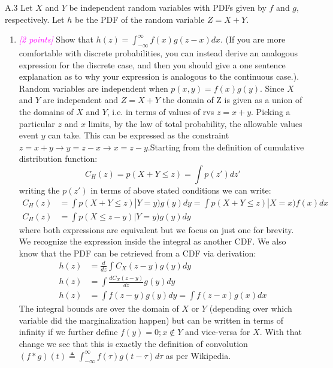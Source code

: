 \documentclass{article}
\newcommand{\1}{\mathbf{1}}
\newcommand{\points}[1]{\small\textcolor{magenta}{\emph{[#1 points]}} \normalsize}
\begin{document}
\newpage
A.3 Let $X$ and $Y$ be independent random variables with PDFs given by $f$ and $g$, respectively. Let $h$ be the PDF of the random variable $Z = X+Y$.
\begin{enumerate}
	\item \points{2} Show that $h(z) = \int_{-\infty}^\infty f(x) g( z - x ) d x $.  (If you are more comfortable with discrete probabilities, you can instead derive an analogous expression for the discrete case,  and then you should give a one sentence explanation as to why your expression is analogous to the continuous case.). \\
	Random variables are independent when $p(x,y) = f(x)g(y)$. Since $X$ and $Y$ are independent and $Z=X+Y$ the domain of Z is given as a union of the domains of $X$ and $Y$, i.e. in terms of values of rvs $z=x+y$. Picking a particular $z$ and $x$ limits, by the law of total probability, the allowable values event $y$ can take. This can be expressed as the constraint $z=x+y \rightarrow y=z-x \rightarrow x=z-y$.Starting from the definition of cumulative distribution function: 
	$$C_H(z) = p(X+Y\leq z) = \int p(z')dz'$$
	writing the $p(z')$ in terms of above stated conditions we can write:
	\begin{align*}
	    C_H(z) &= \int p(X+Y\leq z)|Y=y)g(y)dy = \int p(X+Y\leq z)|X=x)f(x)dx \\
	    C_H(z) &= \int p(X\leq z-y)|Y=y)g(y)dy 
	\end{align*}
	where both expressions are equivalent but we focus on just one for brevity. We recognize the expression inside the integral as another CDF. We also know that the PDF can be retrieved from a CDF via derivation:
	\begin{align*}
	    h(z) &= \frac{d}{dz}\int C_X(z-y)g(y)dy \\
	    h(z) &= \int \frac{dC_X(z-y)}{dz}g(y)dy \\
	    h(z) &= \int f(z-y)g(y)dy = \int f(z-x)g(x)dx
	\end{align*}
    The integral bounds are over the domain of $X$ or $Y$ (depending over which variable did the marginalization happen) but can be written in terms of infinity if we further define $f(y)=0; x\not\in Y$ and vice-versa for $X$. With that change we see that this is exactly the definition of convolution $(f*g)(t) \triangleq \int_{-\infty}^\infty f(\tau)g(t-\tau)d\tau$ as per Wikipedia. 


\end{enumerate}
\end{document}
